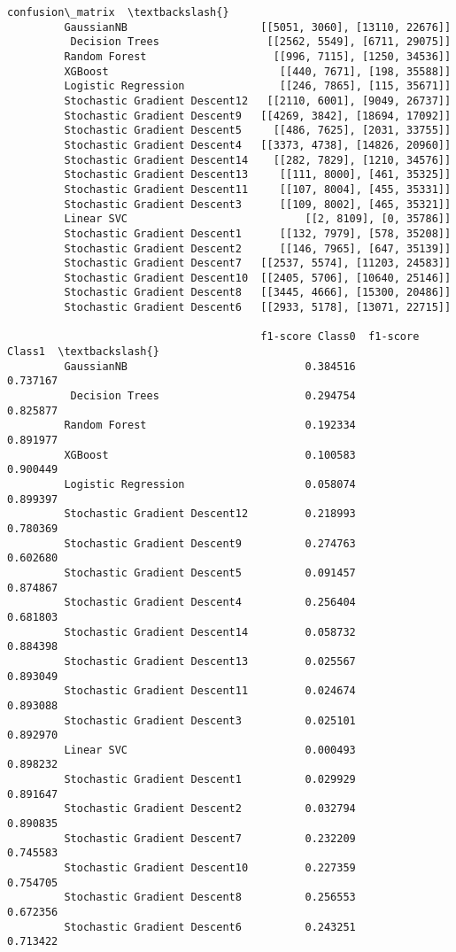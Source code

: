 \documentclass[11pt]{article}
\begin{document}
\begin{Verbatim}[commandchars=\\\{\}]
                                                      confusion\_matrix  \textbackslash{}
         GaussianNB                     [[5051, 3060], [13110, 22676]]   
          Decision Trees                 [[2562, 5549], [6711, 29075]]   
         Random Forest                    [[996, 7115], [1250, 34536]]   
         XGBoost                           [[440, 7671], [198, 35588]]   
         Logistic Regression               [[246, 7865], [115, 35671]]   
         Stochastic Gradient Descent12   [[2110, 6001], [9049, 26737]]   
         Stochastic Gradient Descent9   [[4269, 3842], [18694, 17092]]   
         Stochastic Gradient Descent5     [[486, 7625], [2031, 33755]]   
         Stochastic Gradient Descent4   [[3373, 4738], [14826, 20960]]   
         Stochastic Gradient Descent14    [[282, 7829], [1210, 34576]]   
         Stochastic Gradient Descent13     [[111, 8000], [461, 35325]]   
         Stochastic Gradient Descent11     [[107, 8004], [455, 35331]]   
         Stochastic Gradient Descent3      [[109, 8002], [465, 35321]]   
         Linear SVC                            [[2, 8109], [0, 35786]]   
         Stochastic Gradient Descent1      [[132, 7979], [578, 35208]]   
         Stochastic Gradient Descent2      [[146, 7965], [647, 35139]]   
         Stochastic Gradient Descent7   [[2537, 5574], [11203, 24583]]   
         Stochastic Gradient Descent10  [[2405, 5706], [10640, 25146]]   
         Stochastic Gradient Descent8   [[3445, 4666], [15300, 20486]]   
         Stochastic Gradient Descent6   [[2933, 5178], [13071, 22715]]   
         
                                        f1-score Class0  f1-score Class1  \textbackslash{}
         GaussianNB                            0.384516         0.737167   
          Decision Trees                       0.294754         0.825877   
         Random Forest                         0.192334         0.891977   
         XGBoost                               0.100583         0.900449   
         Logistic Regression                   0.058074         0.899397   
         Stochastic Gradient Descent12         0.218993         0.780369   
         Stochastic Gradient Descent9          0.274763         0.602680   
         Stochastic Gradient Descent5          0.091457         0.874867   
         Stochastic Gradient Descent4          0.256404         0.681803   
         Stochastic Gradient Descent14         0.058732         0.884398   
         Stochastic Gradient Descent13         0.025567         0.893049   
         Stochastic Gradient Descent11         0.024674         0.893088   
         Stochastic Gradient Descent3          0.025101         0.892970   
         Linear SVC                            0.000493         0.898232   
         Stochastic Gradient Descent1          0.029929         0.891647   
         Stochastic Gradient Descent2          0.032794         0.890835   
         Stochastic Gradient Descent7          0.232209         0.745583   
         Stochastic Gradient Descent10         0.227359         0.754705   
         Stochastic Gradient Descent8          0.256553         0.672356   
         Stochastic Gradient Descent6          0.243251         0.713422   
         

\end{Verbatim}
\end{document}

